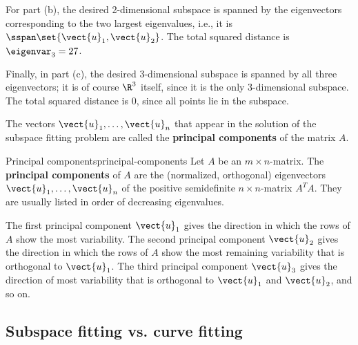 \begin{solution}
  For part (b), the desired 2-dimensional subspace is spanned by the
  eigenvectors corresponding to the two largest eigenvalues, i.e., it
  is $\sspan\set{\vect{u}_1,\vect{u}_2}$. The total squared distance is
  $\eigenvar_3 = 27$.

  Finally, in part (c), the desired 3-dimensional subspace is spanned
  by all three eigenvectors; it is of course $\R^3$ itself, since it
  is the only 3-dimensional subspace. The total squared distance is
  $0$, since all points lie in the subspace.
\end{solution}

The vectors $\vect{u}_1,\ldots,\vect{u}_n$ that appear in the solution
of the subspace fitting problem are called the \textbf{principal
  components} of the matrix $A$.

\begin{definition}{Principal components}{principal-components}
  Let $A$ be an $m\times n$-matrix. The \textbf{principal components}%
   of $A$ are the (normalized, orthogonal)
  eigenvectors $\vect{u}_1,\ldots,\vect{u}_n$ of the positive
  semidefinite $n\times n$-matrix $A^TA$. They are usually listed in
  order of decreasing eigenvalues.
\end{definition}

The first principal component $\vect{u}_1$ gives the direction in
which the rows of $A$ show the most variability. The second principal
component $\vect{u}_2$ gives the direction in which the rows of $A$
show the most remaining variability that is orthogonal to
$\vect{u}_1$. The third principal component $\vect{u}_3$ gives the
direction of most variability that is orthogonal to $\vect{u}_1$ and
$\vect{u}_2$, and so on.

\subsection*{Subspace fitting vs. curve fitting}

